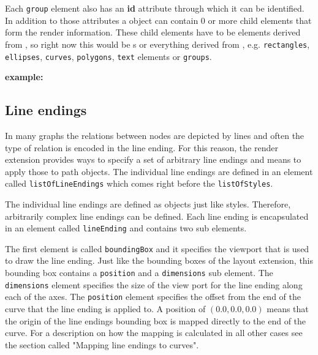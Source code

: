 Each \texttt{group} element also has an \textbf{id} attribute through which it can be identified. 
In addition to those attributes a \Group object can contain 0 or more child
elements that form the render information. These child elements have to be elements derived from \TransformationTwoD,
so right now this would be {\Image}s or everything derived from \GraphicalPrimitiveOneD,
e.g. \texttt{rectangles}, \texttt{ellipses}, \texttt{curves}, \texttt{polygons}, \texttt{text} elements
or \texttt{groups}.

{\large
{\bf
example:
}
}

{\footnotesize
{}
}

\subsection{Line endings}
\label{lineending-class}
In many graphs the relations between nodes are depicted by lines and often the 
type of relation is encoded in the line ending. For this reason, the render
extension provides ways to specify a set of arbitrary line endings and means to
apply those to path objects.
The individual line endings are defined in an element called
\texttt{listOfLineEndings} which comes right before the \texttt{listOf\-Styles}.

The individual line endings are defined as \Group objects just like styles. 
Therefore, 
arbitrarily complex line endings can be defined. Each line ending is
encapsulated in an element called \texttt{lineEnding} and contains two
sub elements. 

The first element is called \texttt{boundingBox} and it specifies the
viewport that is used to draw the line ending. Just like the bounding boxes of
the layout extension, this bounding box contains a \texttt{position} and a
\texttt{dimensions} sub element. The \texttt{dimensions} element  
specifies the size of the view port for the line ending along each of the axes. 
The \texttt{position} element specifies the offset from the end of the curve that the line ending is applied to.
A position of $(0.0, 0.0, 0.0)$ means that the origin of the line endings bounding box is mapped directly to
the end of the curve. For a description on how the mapping is calculated in all other cases see the section called "Mapping line endings to curves".


